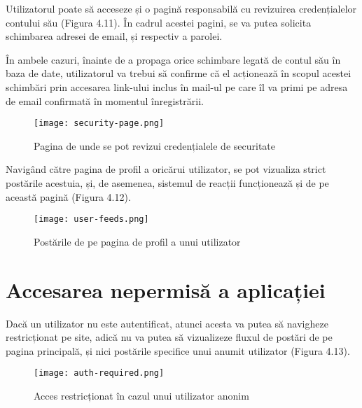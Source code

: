 Utilizatorul poate să acceseze și o pagină responsabilă cu revizuirea credențialelor contului său (Figura 4.11). În cadrul acestei pagini, se va putea solicita schimbarea adresei de email, și respectiv a parolei.\newline

În ambele cazuri, înainte de a propaga orice schimbare legată de contul său în baza de date, utilizatorul va trebui să confirme că el acționează în scopul acestei schimbări prin accesarea link-ului inclus în mail-ul pe care îl va primi pe adresa de email confirmată în momentul înregistrării.\newline
\bigskip

\begin{figure}[H]
	\begin{center}
		\texttt{[image: security-page.png]}
		\caption{Pagina de unde se pot revizui credențialele de securitate}
	\end{center}
\end{figure}
\bigskip

Navigând către pagina de profil a oricărui utilizator, se pot vizualiza strict postările acestuia, și, de asemenea, sistemul de reacții funcționează și de pe această pagină (Figura 4.12).\newline
\bigskip

\begin{figure}[H]
	\begin{center}
		\texttt{[image: user-feeds.png]}
		\caption{Postările de pe pagina de profil a unui utilizator}
	\end{center}
\end{figure}



\section{Accesarea nepermisă a aplicației}

Dacă un utilizator nu este autentificat, atunci acesta va putea să navigheze restricționat pe site, adică nu va putea să vizualizeze fluxul de postări de pe pagina principală, și nici postările specifice unui anumit utilizator (Figura 4.13).\newline
\bigskip

\begin{figure}[H]
	\begin{center}
		\texttt{[image: auth-required.png]}
		\caption{Acces restricționat în cazul unui utilizator anonim}
	\end{center}
\end{figure}
\bigskip


